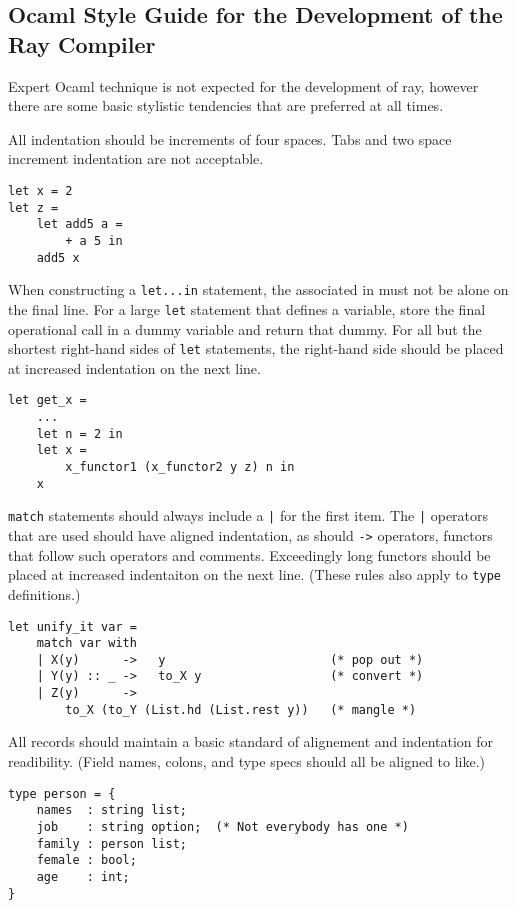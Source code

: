 \lstset{language=caml,frame=single,
  xleftmargin=\parindent}
\subsection{Ocaml Style Guide for the Development of the Ray Compiler}

Expert Ocaml technique is not expected for the development of ray, however there are some basic stylistic tendencies that are preferred at all times.



All indentation should be increments of four spaces. Tabs and two space increment indentation are not acceptable.

\begin{lstlisting}
let x = 2
let z =
    let add5 a =
        + a 5 in
    add5 x
\end{lstlisting}



When constructing a \verb|let...in| statement, the associated in must not be alone on the final line. For a large \verb|let| statement that defines a variable, store the final operational call in a dummy variable and return that dummy. For all but the shortest right-hand sides of \verb|let| statements, the right-hand side should be placed at increased indentation on the next line.

\begin{lstlisting}
let get_x =
    ...
    let n = 2 in
    let x =
        x_functor1 (x_functor2 y z) n in
    x
\end{lstlisting}



\verb|match| statements should always include a \verb[|[ for the first item. The \verb[|[ operators that are used should have aligned indentation, as should \verb|->| operators, functors that follow such operators and comments. Exceedingly long functors should be placed at increased indentaiton on the next line. (These rules also apply to \verb|type| definitions.)

\begin{lstlisting}
let unify_it var =
    match var with
    | X(y)      ->   y                       (* pop out *)
    | Y(y) :: _ ->   to_X y                  (* convert *)
    | Z(y)      ->
        to_X (to_Y (List.hd (List.rest y))   (* mangle *)
\end{lstlisting}



All records should maintain a basic standard of alignement and indentation for readibility. (Field names, colons, and type specs should all be aligned to like.)

\begin{lstlisting}
type person = {
    names  : string list;
    job    : string option;  (* Not everybody has one *)
    family : person list;
    female : bool;
    age    : int;
}
\end{lstlisting}